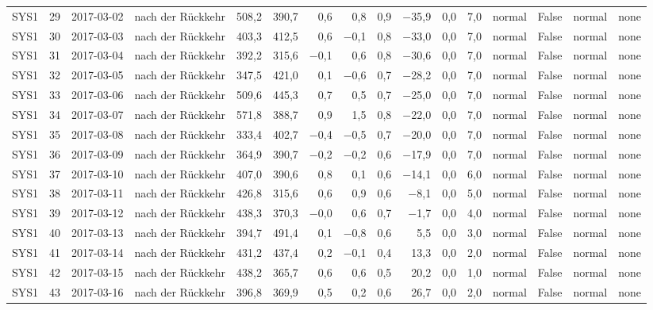 \begin{tabular}{lrllrrrrrrrrlrll}
SYS1 & 29 & 2017-03-02 & nach der Rückkehr & 508,2 & 390,7 & 0,6 & 0,8 & 0,9 & $-$35,9 & 0,0 & 7,0 & normal & False & normal & none \\
SYS1 & 30 & 2017-03-03 & nach der Rückkehr & 403,3 & 412,5 & 0,6 & $-$0,1 & 0,8 & $-$33,0 & 0,0 & 7,0 & normal & False & normal & none \\
SYS1 & 31 & 2017-03-04 & nach der Rückkehr & 392,2 & 315,6 & $-$0,1 & 0,6 & 0,8 & $-$30,6 & 0,0 & 7,0 & normal & False & normal & none \\
SYS1 & 32 & 2017-03-05 & nach der Rückkehr & 347,5 & 421,0 & 0,1 & $-$0,6 & 0,7 & $-$28,2 & 0,0 & 7,0 & normal & False & normal & none \\
SYS1 & 33 & 2017-03-06 & nach der Rückkehr & 509,6 & 445,3 & 0,7 & 0,5 & 0,7 & $-$25,0 & 0,0 & 7,0 & normal & False & normal & none \\
SYS1 & 34 & 2017-03-07 & nach der Rückkehr & 571,8 & 388,7 & 0,9 & 1,5 & 0,8 & $-$22,0 & 0,0 & 7,0 & normal & False & normal & none \\
SYS1 & 35 & 2017-03-08 & nach der Rückkehr & 333,4 & 402,7 & $-$0,4 & $-$0,5 & 0,7 & $-$20,0 & 0,0 & 7,0 & normal & False & normal & none \\
SYS1 & 36 & 2017-03-09 & nach der Rückkehr & 364,9 & 390,7 & $-$0,2 & $-$0,2 & 0,6 & $-$17,9 & 0,0 & 7,0 & normal & False & normal & none \\
SYS1 & 37 & 2017-03-10 & nach der Rückkehr & 407,0 & 390,6 & 0,8 & 0,1 & 0,6 & $-$14,1 & 0,0 & 6,0 & normal & False & normal & none \\
SYS1 & 38 & 2017-03-11 & nach der Rückkehr & 426,8 & 315,6 & 0,6 & 0,9 & 0,6 & $-$8,1 & 0,0 & 5,0 & normal & False & normal & none \\
SYS1 & 39 & 2017-03-12 & nach der Rückkehr & 438,3 & 370,3 & $-$0,0 & 0,6 & 0,7 & $-$1,7 & 0,0 & 4,0 & normal & False & normal & none \\
SYS1 & 40 & 2017-03-13 & nach der Rückkehr & 394,7 & 491,4 & 0,1 & $-$0,8 & 0,6 & 5,5 & 0,0 & 3,0 & normal & False & normal & none \\
SYS1 & 41 & 2017-03-14 & nach der Rückkehr & 431,2 & 437,4 & 0,2 & $-$0,1 & 0,4 & 13,3 & 0,0 & 2,0 & normal & False & normal & none \\
SYS1 & 42 & 2017-03-15 & nach der Rückkehr & 438,2 & 365,7 & 0,6 & 0,6 & 0,5 & 20,2 & 0,0 & 1,0 & normal & False & normal & none \\
SYS1 & 43 & 2017-03-16 & nach der Rückkehr & 396,8 & 369,9 & 0,5 & 0,2 & 0,6 & 26,7 & 0,0 & 2,0 & normal & False & normal & none \\

\end{tabular}
